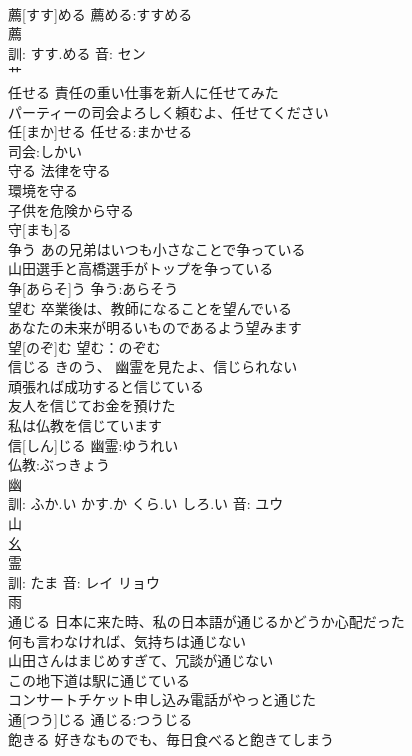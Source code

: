 \documentclass[8pt]{extreport}
\begin{document}
\begin{CJK}{UTF8}{min}
\\	薦[すす]める			薦める:すすめる
\\	薦 
\\	訓: すす.める 音: セン 
\\	艹 
\\	任せる	責任の重い仕事を新人に任せてみた 
\\	パーティーの司会よろしく頼むよ、任せてください 
\\	任[まか]せる			任せる:まかせる
\\	司会:しかい
\\	守る	法律を守る 
\\	環境を守る 
\\	子供を危険から守る 
\\	守[まも]る						
\\	争う	あの兄弟はいつも小さなことで争っている 
\\	山田選手と高橋選手がトップを争っている 
\\	争[あらそ]う			争う:あらそう
\\	望む	卒業後は、教師になることを望んでいる 
\\	あなたの未来が明るいものであるよう望みます 
\\	望[のぞ]む			望む：のぞむ
\\	信じる	きのう、 幽霊を見たよ、信じられない 
\\	頑張れば成功すると信じている 
\\	友人を信じてお金を預けた 
\\	私は仏教を信じています 
\\	信[しん]じる			幽霊:ゆうれい
\\	仏教:ぶっきょう
\\	幽 
\\	訓: ふか.い かす.か くら.い しろ.い 音: ユウ 
\\	山 
\\	幺 
\\	霊 
\\	訓: たま 音: レイ リョウ 
\\	雨 
\\	通じる	日本に来た時、私の日本語が通じるかどうか心配だった 
\\	何も言わなければ、気持ちは通じない 
\\	山田さんはまじめすぎて、冗談が通じない 
\\	この地下道は駅に通じている 
\\	コンサートチケット申し込み電話がやっと通じた 
\\	通[つう]じる			通じる:つうじる
\\	飽きる	好きなものでも、毎日食べると飽きてしまう 

\end{CJK}
\end{document}
